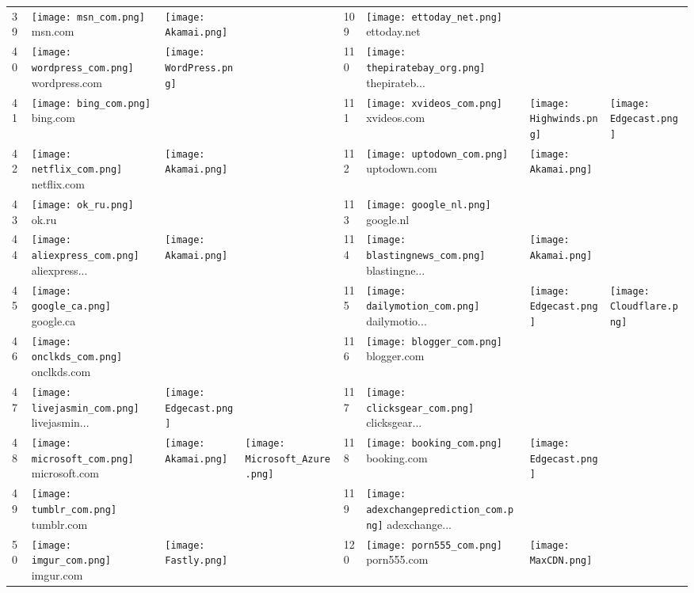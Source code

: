 \begin{table}[]
\begin{tabular}{|llll|llll|}
39 & \texttt{[image: msn\_com.png]} msn.com & \texttt{[image: Akamai.png]} & & 109 & \texttt{[image: ettoday\_net.png]} ettoday.net & & \\
40 & \texttt{[image: wordpress\_com.png]} wordpress.com & \texttt{[image: WordPress.png]} & & 110 & \texttt{[image: thepiratebay\_org.png]} thepirateb... & & \\
41 & \texttt{[image: bing\_com.png]} bing.com & & & 111 & \texttt{[image: xvideos\_com.png]} xvideos.com & \texttt{[image: Highwinds.png]} & \texttt{[image: Edgecast.png]} \\
42 & \texttt{[image: netflix\_com.png]} netflix.com & \texttt{[image: Akamai.png]} & & 112 & \texttt{[image: uptodown\_com.png]} uptodown.com & \texttt{[image: Akamai.png]} & \\
43 & \texttt{[image: ok\_ru.png]} ok.ru & & & 113 & \texttt{[image: google\_nl.png]} google.nl & & \\
44 & \texttt{[image: aliexpress\_com.png]} aliexpress... & \texttt{[image: Akamai.png]} & & 114 & \texttt{[image: blastingnews\_com.png]} blastingne... & \texttt{[image: Akamai.png]} & \\
45 & \texttt{[image: google\_ca.png]} google.ca & & & 115 & \texttt{[image: dailymotion\_com.png]} dailymotio... & \texttt{[image: Edgecast.png]} & \texttt{[image: Cloudflare.png]} \\
46 & \texttt{[image: onclkds\_com.png]} onclkds.com & & & 116 & \texttt{[image: blogger\_com.png]} blogger.com & & \\
47 & \texttt{[image: livejasmin\_com.png]} livejasmin... & \texttt{[image: Edgecast.png]} & & 117 & \texttt{[image: clicksgear\_com.png]} clicksgear... & & \\
48 & \texttt{[image: microsoft\_com.png]} microsoft.com & \texttt{[image: Akamai.png]} & \texttt{[image: Microsoft\_Azure.png]} & 118 & \texttt{[image: booking\_com.png]} booking.com & \texttt{[image: Edgecast.png]} & \\
49 & \texttt{[image: tumblr\_com.png]} tumblr.com & & & 119 & \texttt{[image: adexchangeprediction\_com.png]} adexchange... & & \\
50 & \texttt{[image: imgur\_com.png]} imgur.com & \texttt{[image: Fastly.png]} & & 120 & \texttt{[image: porn555\_com.png]} porn555.com & \texttt{[image: MaxCDN.png]} & \\

\end{tabular}
\end{table}
